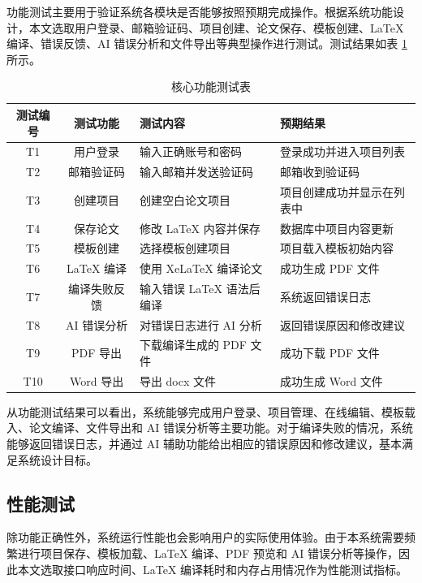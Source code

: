 \documentclass{xduugthesis}
\begin{document}
功能测试主要用于验证系统各模块是否能够按照预期完成操作。根据系统功能设计，本文选取用户登录、邮箱验证码、项目创建、论文保存、模板创建、LaTeX 编译、错误反馈、AI 错误分析和文件导出等典型操作进行测试。测试结果如表 \ref{tab:function-test} 所示。

\begin{table}[!ht]
    \centering
    \caption{核心功能测试表}
    \label{tab:function-test}
    \begin{tabular}{|c|c|p{6cm}|p{4cm}|}
        \hline
        测试编号 & 测试功能 & 测试内容 & 预期结果 \\
        \hline
        T1 & 用户登录 & 输入正确账号和密码 & 登录成功并进入项目列表 \\
        \hline
        T2 & 邮箱验证码 & 输入邮箱并发送验证码 & 邮箱收到验证码 \\
        \hline
        T3 & 创建项目 & 创建空白论文项目 & 项目创建成功并显示在列表中 \\
        \hline
        T4 & 保存论文 & 修改 LaTeX 内容并保存 & 数据库中项目内容更新 \\
        \hline
        T5 & 模板创建 & 选择模板创建项目 & 项目载入模板初始内容 \\
        \hline
        T6 & LaTeX 编译 & 使用 XeLaTeX 编译论文 & 成功生成 PDF 文件 \\
        \hline
        T7 & 编译失败反馈 & 输入错误 LaTeX 语法后编译 & 系统返回错误日志 \\
        \hline
        T8 & AI 错误分析 & 对错误日志进行 AI 分析 & 返回错误原因和修改建议 \\
        \hline
        T9 & PDF 导出 & 下载编译生成的 PDF 文件 & 成功下载 PDF 文件 \\
        \hline
        T10 & Word 导出 & 导出 docx 文件 & 成功生成 Word 文件 \\
        \hline
    \end{tabular}
\end{table}

从功能测试结果可以看出，系统能够完成用户登录、项目管理、在线编辑、模板载入、论文编译、文件导出和 AI 错误分析等主要功能。对于编译失败的情况，系统能够返回错误日志，并通过 AI 辅助功能给出相应的错误原因和修改建议，基本满足系统设计目标。

\subsection{性能测试}

除功能正确性外，系统运行性能也会影响用户的实际使用体验。由于本系统需要频繁进行项目保存、模板加载、LaTeX 编译、PDF 预览和 AI 错误分析等操作，因此本文选取接口响应时间、LaTeX 编译耗时和内存占用情况作为性能测试指标。
\end{document}
